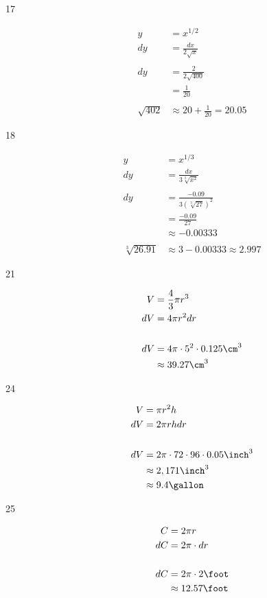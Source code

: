 \documentclass[fleqn]{exam}
\begin{document}
\begin{description}
\begin{enumerate}[a]
\end{enumerate}

\item[17]
\begin{align*}
  y &= x^{1/2} \\
  dy &= \frac{dx}{2 \sqrt{x}} \\
  \\
  dy &= \frac{2}{2 \sqrt{400}} \\
     &= \frac{1}{20} \\
  \\
  \sqrt{402} &\approx 20 + \frac{1}{20} = 20.05
\end{align*}

\item[18]
\begin{align*}
  y &= x^{1/3} \\
  dy &= \frac{dx}{3 \sqrt[3]{x^2}} \\
  \\
  dy &= \frac{-0.09}{3 (\sqrt[3]{27})^2} \\
     &= \frac{-0.09}{27} \\
     &\approx -0.00333 \\
  \\
  \sqrt[3]{26.91} &\approx 3 - 0.00333 \approx 2.997
\end{align*}

\item[21]
\begin{align*}
  V  &= \frac{4}{3} \pi r^3 \\
  dV &= 4 \pi r^2 dr \\
  \\
  dV &= 4 \pi \cdot 5^2 \cdot 0.125 \cm^3 \\
     &\approx 39.27 \cm^3 \\
\end{align*}

\item[24]
\begin{align*}
  V  &= \pi r^2h \\
  dV &= 2 \pi rh dr \\
  \\
  dV &= 2 \pi \cdot 72 \cdot 96 \cdot 0.05 \inch^3 \\
     &\approx 2,171 \inch^3 \\
     &\approx 9.4 \gallon \\
\end{align*}

\item[25]
\begin{align*}
  C  &= 2 \pi r \\
  dC &= 2 \pi \cdot dr \\
  \\
  dC &= 2 \pi \cdot 2 \foot \\
     &\approx 12.57 \foot \\
\end{align*}


\end{description}
\end{document}
